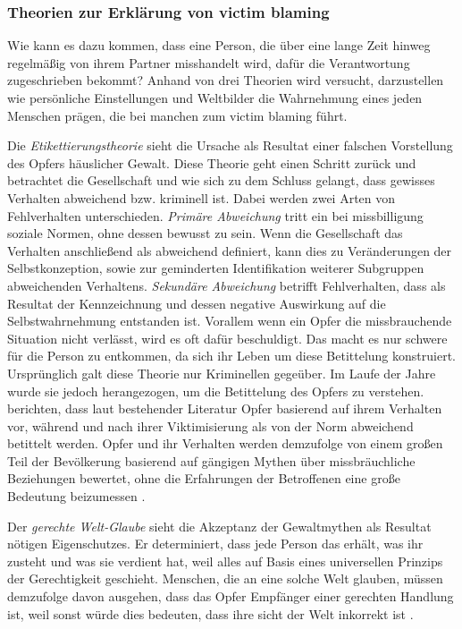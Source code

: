 \subsubsection{Theorien zur Erklärung von victim blaming}     \label{2.1.3.2}
Wie kann es dazu kommen, dass eine Person, die über eine lange Zeit hinweg regelmäßig von ihrem Partner misshandelt wird, dafür die Verantwortung zugeschrieben bekommt? Anhand von drei Theorien wird versucht, darzustellen wie persönliche Einstellungen und Weltbilder die Wahrnehmung eines jeden Menschen prägen, die bei manchen zum victim blaming führt.

Die \textit{Etikettierungstheorie} sieht die Ursache als Resultat einer falschen Vorstellung des Opfers häuslicher Gewalt. Diese Theorie geht einen Schritt zurück und betrachtet die Gesellschaft und wie sich zu dem Schluss gelangt, dass gewisses Verhalten abweichend bzw. kriminell ist. Dabei werden zwei Arten von Fehlverhalten unterschieden. \textit{Primäre Abweichung} tritt ein bei missbilligung soziale Normen, ohne dessen bewusst zu sein. Wenn die Gesellschaft das Verhalten anschließend als abweichend definiert, kann dies zu Veränderungen der Selbstkonzeption, sowie zur geminderten Identifikation weiterer Subgruppen abweichenden Verhaltens. \textit{Sekundäre Abweichung} betrifft Fehlverhalten, dass als Resultat der Kennzeichnung und dessen negative Auswirkung auf die Selbstwahrnehmung entstanden ist. Vorallem wenn ein Opfer die missbrauchende Situation nicht verlässt, wird es oft dafür beschuldigt. Das macht es nur schwere für die Person zu entkommen, da sich ihr Leben um diese Betittelung konstruiert. Ursprünglich galt diese Theorie nur Kriminellen gegeüber. Im Laufe der Jahre wurde sie jedoch herangezogen, um die Betittelung des Opfers zu verstehen. \textcite{Labelingtheory_plus} berichten, dass laut bestehender Literatur Opfer basierend auf ihrem Verhalten vor, während und nach ihrer Viktimisierung als von der Norm abweichend betittelt werden. Opfer und ihr Verhalten werden demzufolge von einem großen Teil der Bevölkerung basierend auf gängigen Mythen über missbräuchliche Beziehungen bewertet, ohne die Erfahrungen der Betroffenen eine große Bedeutung beizumessen \parencite{Labelingtheory_plus}.

Der \textit{gerechte Welt-Glaube} sieht die Akzeptanz der Gewaltmythen als Resultat nötigen Eigenschutzes. Er determiniert, dass jede Person das erhält, was ihr zusteht und was sie verdient hat, weil alles auf Basis eines universellen Prinzips der Gerechtigkeit geschieht. Menschen, die an eine solche Welt glauben, müssen demzufolge davon ausgehen, dass das Opfer Empfänger einer gerechten Handlung ist, weil sonst würde dies bedeuten, dass ihre sicht der Welt inkorrekt ist \parencite{GM_Theorien}. 

